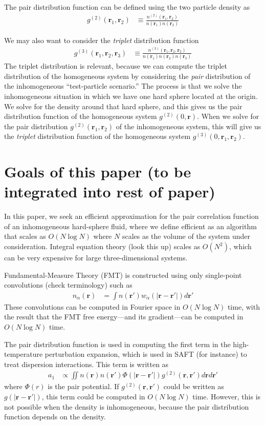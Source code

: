 \documentclass[letterpaper,twocolumn,amsmath,amssymb,pre,aps,10pt]{revtex4-1}
\newcommand{\rr}{\textbf{r}}
\begin{document}
The pair distribution function can be defined using the two particle
density as
\begin{align}
  g^{(2)}(\rr_1,\rr_2) &\equiv \frac{n^{(2)}(\rr_1,\rr_2)}{n(\rr_1)n(\rr_2)}
\end{align}

We may also want to consider the \emph{triplet} distribution function
\begin{align}
  g^{(3)}(\rr_1,\rr_2,\rr_3) &\equiv \frac{n^{(3)}(\rr_1,\rr_2,\rr_3)}{n(\rr_1)n(\rr_2)n(\rr_3)}
\end{align}
The triplet distribution is relevant, because we can compute the
triplet distribution of the homogeneous system by considering the
\emph{pair} distribution of the inhomogeneous ``test-particle
scenario.''  The process is that we solve the inhomogeneous situation
in which we have one hard sphere located at the origin.  We solve for
the density around that hard sphere, and this gives us the pair
distribution function of the homogeneous system $g^{(2)}(0, \rr)$.
When we solve for the pair distribution $g^{(2)}(\rr_1,\rr_2)$ of the
inhomogeneous system, this will give us the \emph{triplet}
distribution function of the homogeneous system
$g^{(3)}(0,\rr_1,\rr_2)$.

\section{Goals of this paper (to be integrated into rest of paper)}


In this paper, we seek an efficient approximation for the pair
correlation function of an inhomogeneous hard-sphere fluid, where we
define efficient as an algorithm that scales as $O(N\log N)$ where $N$
scales as the volume of the system under consideration.
Integral equation theory (look this up) scales as $O(N^2)$, which can
be very expensive for large three-dimensional systems.

Fundamental-Measure Theory (FMT) is constructed using only single-point
convolutions (check terminology) such as
\begin{align}
  n_\alpha(\rr) &= \int n(\rr')w_\alpha(|\rr-\rr'|) d\rr'
\end{align}
These convolutions can be computed in Fourier space in $O(N\log N)$
time, with the result that the FMT free energy---and its
gradient---can be computed in $O(N\log N)$ time.

The pair distribution function is used in computing the first term in
the high-temperature perturbation expansion, which is used in SAFT
(for instance) to treat dispersion interactions.  This term is written
as
\begin{align}\label{eq:a1}
  a_1 &\propto \iint n(\rr)n(\rr') \Phi(|\rr-\rr'|)
  g^{(2)}(\rr,\rr')d\rr d\rr'
\end{align}
where $\Phi(r)$ is the pair potential.  If $g^{(2)}(\rr,\rr')$ could
be written as $g(|\rr-\rr'|)$, this term could be computed in $O(N\log
N)$ time.  However, this is not possible when the density is
inhomogeneous, because the pair distribution function depends on the
density.
\end{document}
